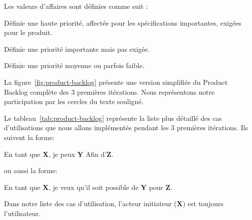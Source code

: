 Les valeurs d'affaires sont définies comme suit :
\begin{description}[align=right,labelwidth=1cm]
    \item [1] Définie une haute priorité, affectée pour les spécifications
        importantes, exigées pour le produit.
    \item [2] Définie une priorité importante mais pas exigée.
    \item [3] Définie une priorité moyenne ou parfois faible.
\end{description}

La figure~\ref{fig:product-backlog} présente une version simplifiée du Product
Backlog complète des 3 premières itérations. Nous représentons notre
participation par les cercles du texte souligné.



Le tableau~\ref{tab:product-backlog} représente la liste plus détaillé des cas
d'utilisations que nous allons implémentés pendant les 3 premières itérations.
Ils suivent la forme:
\begin{displayquote}
    En tant que \textbf{X}, je peux \textbf{Y} Afin d'\textbf{Z}.
\end{displayquote}
ou aussi la forme:
\begin{displayquote}
    En tant que \textbf{X}, je veux qu'il soit possible de \textbf{Y} pour
    \textbf{Z}.
\end{displayquote}

Dans notre liste des cas d'utilisation, l'acteur initiateur (\textbf{X}) est
toujours l'utilisateur.

